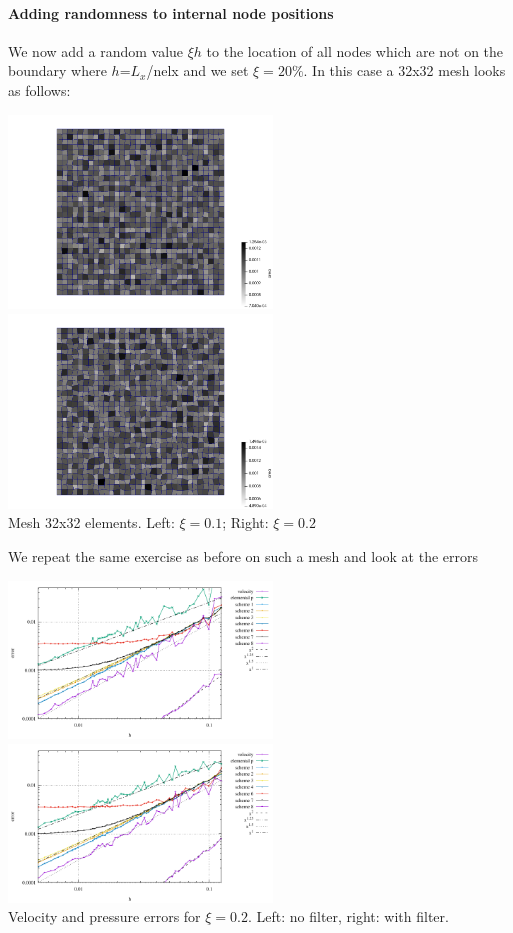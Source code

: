 \newpage
\paragraph{Adding randomness to internal node positions} We now add a random value $\xi h$ to the 
location of all nodes which are not on the boundary where $h$=$L_x$/nelx and we set $\xi=20\%$.
In this case a 32x32 mesh looks as follows:

\begin{center}
\includegraphics[width=7cm]{python_codes/fieldstone_12/results/rand/area_0p1}
\includegraphics[width=7cm]{python_codes/fieldstone_12/results/rand/area_0p2}\\
{\captionfont Mesh 32x32 elements. Left: $\xi=0.1$; Right: $\xi=0.2$}
\end{center}

We repeat the same exercise as before on such a mesh and look at the errors

\begin{center}
\includegraphics[width=7cm]{python_codes/fieldstone_12/results/rand/errors_nofilter}
\includegraphics[width=7cm]{python_codes/fieldstone_12/results/rand/errors_filter}\\
{\captionfont Velocity and pressure errors for $\xi=0.2$. Left: no filter, right: with filter.} 
\end{center}

